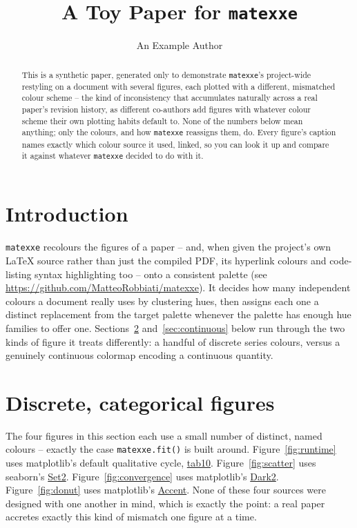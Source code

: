 \documentclass[11pt]{article}
\title{A Toy Paper for \texttt{matexxe}}
\author{An Example Author}
\date{}
\begin{document}
\maketitle
\tableofcontents
\vspace{1em}

\begin{abstract}
This is a synthetic paper, generated only to demonstrate \texttt{matexxe}'s
project-wide restyling on a document with several figures, each plotted
with a different, mismatched colour scheme -- the kind of inconsistency
that accumulates naturally across a real paper's revision history, as
different co-authors add figures with whatever colour scheme their own
plotting habits default to. None of the numbers below mean anything; only
the colours, and how \texttt{matexxe} reassigns them, do. Every figure's
caption names exactly which colour source it used, linked, so you can look
it up and compare it against whatever \texttt{matexxe} decided to do with
it.
\end{abstract}

\section{Introduction}
\texttt{matexxe} recolours the figures of a paper -- and, when given the
project's own \LaTeX{} source rather than just the compiled PDF, its
hyperlink colours and code-listing syntax highlighting too -- onto a
consistent palette (see \url{https://github.com/MatteoRobbiati/matexxe}).
It decides how many independent colours a document really uses by
clustering hues, then assigns each one a distinct replacement from the
target palette whenever the palette has enough hue families to offer one.
Sections~\ref{sec:categorical} and~\ref{sec:continuous} below run through
the two kinds of figure it treats differently: a handful of discrete
series colours, versus a genuinely continuous colormap encoding a
continuous quantity.

\section{Discrete, categorical figures}
\label{sec:categorical}
The four figures in this section each use a small number of distinct,
named colours -- exactly the case \texttt{matexxe.fit()} is built around.
Figure~\ref{fig:runtime} uses matplotlib's default qualitative cycle,
\href{https://matplotlib.org/stable/users/prev_whats_new/dflt_style_changes.html#colors-in-default-property-cycle}{tab10}.
Figure~\ref{fig:scatter} uses seaborn's
\href{https://seaborn.pydata.org/tutorial/color_palettes.html}{Set2}.
Figure~\ref{fig:convergence} uses matplotlib's
\href{https://matplotlib.org/stable/users/explain/colors/colormaps.html\#qualitative}{Dark2}.
Figure~\ref{fig:donut} uses matplotlib's
\href{https://matplotlib.org/stable/users/explain/colors/colormaps.html\#qualitative}{Accent}.
None of these four sources were designed with one another in mind, which
is exactly the point: a real paper accretes exactly this kind of mismatch
one figure at a time.
\end{document}
